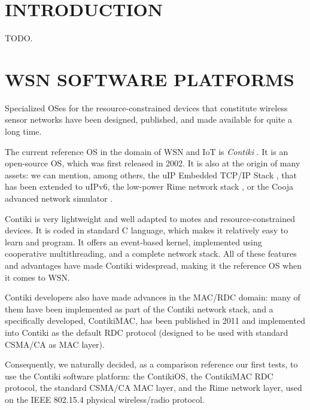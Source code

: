\documentclass[a4paper,twoside]{article}
\begin{document}
\onecolumn \maketitle \normalsize \vfill


\section{\uppercase{Introduction}}

TODO.



\section{\uppercase{WSN Software platforms}}

Specialized OSes for the resource-constrained devices that constitute
wireless sensor networks have been designed, published, and made available
for quite a long time.


The current reference OS in the domain of WSN and IoT is \emph{Contiki}
\cite{ContikiOS}. It is an open-source OS, which was first released
in 2002. It is also at the origin of many assets: we can mention, among
others, the uIP Embedded TCP/IP Stack \cite{uip}, that has been extended
to uIPv6, the low-power Rime network stack \cite{Rime}, or the Cooja
advanced network simulator \cite{Cooja}.

Contiki is very lightweight and well adapted to motes and
resource-constrained devices. It is coded in standard C language, which
makes it relatively easy to learn and program. It offers an event-based
kernel, implemented using cooperative multithreading, and a complete
network stack. All of these features and advantages have made
Contiki widespread, making it the reference OS when it comes to WSN.

Contiki developers also have made advances in the MAC/RDC domain: many
of them have been implemented as part of the Contiki network stack, and
a specifically developed, ContikiMAC, has been published in 2011
\cite{ContikiMAC} and implemented into Contiki as the default
RDC protocol (designed to be used with standard CSMA/CA as MAC layer).

Consequently, we naturally decided, as a comparison reference our first tests,
to use the Contiki software platform: the ContikiOS, the ContikiMAC RDC
protocol, the standard CSMA/CA MAC layer, and the Rime network layer, used
on the IEEE 802.15.4 physical wireless/radio protocol.
\end{document}
